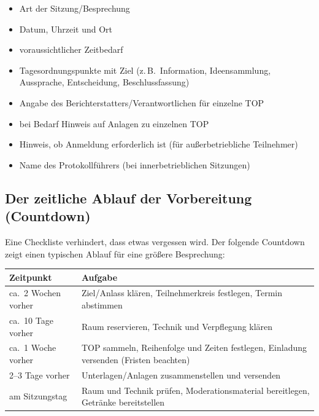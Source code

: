 \documentclass[11pt, a4paper]{article}
\begin{document}
\begin{merksatz}[title={\bfseries Pflichtangaben einer detaillierten Einladung}]
\begin{itemize}[itemsep=1pt]
  \item Art der Sitzung/Besprechung
  \item Datum, Uhrzeit und Ort
  \item voraussichtlicher Zeitbedarf
  \item Tagesordnungspunkte mit Ziel (z.\,B.\ Information, Ideensammlung, Aussprache, Entscheidung, Beschlussfassung)
  \item Angabe des Berichterstatters/Verantwortlichen für einzelne TOP
  \item bei Bedarf Hinweis auf Anlagen zu einzelnen TOP
  \item Hinweis, ob Anmeldung erforderlich ist (für außerbetriebliche Teilnehmer)
  \item Name des Protokollführers (bei innerbetrieblichen Sitzungen)
\end{itemize}
\end{merksatz}

\subsection{Der zeitliche Ablauf der Vorbereitung (Countdown)}

Eine Checkliste verhindert, dass etwas vergessen wird. Der folgende Countdown zeigt einen
typischen Ablauf für eine größere Besprechung:

\begin{center}
\begin{tabular}{p{3.2cm} p{10.0cm}}
\toprule
\textbf{Zeitpunkt} & \textbf{Aufgabe}\\
\midrule
ca.\ 2 Wochen vorher & Ziel/Anlass klären, Teilnehmerkreis festlegen, Termin abstimmen\\
ca.\ 10 Tage vorher & Raum reservieren, Technik und Verpflegung klären\\
ca.\ 1 Woche vorher & TOP sammeln, Reihenfolge und Zeiten festlegen, Einladung versenden (Fristen beachten)\\
2--3 Tage vorher & Unterlagen/Anlagen zusammenstellen und versenden\\
am Sitzungstag & Raum und Technik prüfen, Moderationsmaterial bereitlegen, Getränke bereitstellen\\
\bottomrule
\end{tabular}
\end{center}
\end{document}
